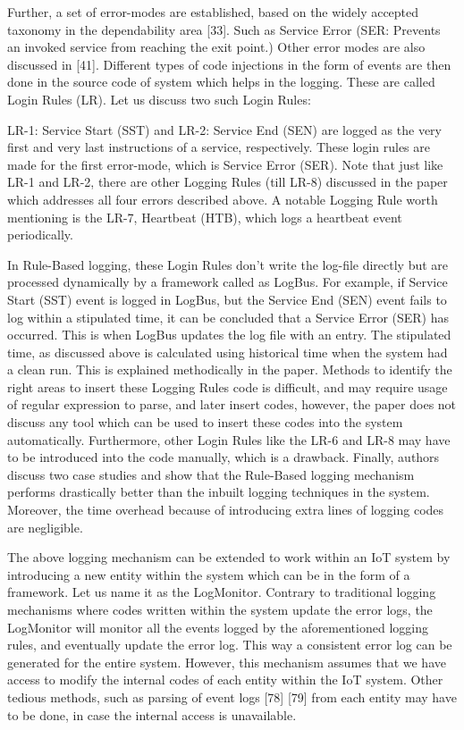 Further, a set of error-modes are established, based on the widely accepted taxonomy in the dependability area [33]. Such as Service Error (SER: Prevents an invoked service from reaching the exit point.) Other error modes are also discussed in [41]. Different types of code injections in the form of events are then done in the source code of system which helps in the logging. These are called Login Rules (LR). Let us discuss two such Login Rules:

LR-1: Service Start (SST) and LR-2: Service End (SEN) are logged as the very first and very last instructions of a service, respectively. These login rules are made for the first error-mode, which is Service Error (SER). Note that just like LR-1 and LR-2, there are other Logging Rules (till LR-8) discussed in the paper which addresses all four errors described above. A notable Logging Rule worth mentioning is the LR-7, Heartbeat (HTB), which logs a heartbeat event periodically. 

In Rule-Based logging, these Login Rules don’t write the log-file directly but are processed dynamically by a framework called as LogBus. For example, if Service Start (SST) event is logged in LogBus, but the Service End (SEN) event fails to log within a stipulated time, it can be concluded that a Service Error (SER) has occurred. This is when LogBus updates the log file with an entry. The stipulated time, as discussed above is calculated using historical time when the system had a clean run. This is explained methodically in the paper. Methods to identify the right areas to insert these Logging Rules code is difficult, and may require usage of regular expression to parse, and later insert codes, however, the paper does not discuss any tool which can be used to insert these codes into the system automatically. Furthermore, other Login Rules like the LR-6 and LR-8 may have to be introduced into the code manually, which is a drawback. Finally, authors discuss two case studies and show that the Rule-Based logging mechanism performs drastically better than the inbuilt logging techniques in the system. Moreover, the time overhead because of introducing extra lines of logging codes are negligible.

The above logging mechanism can be extended to work within an IoT system by introducing a new entity within the system which can be in the form of a framework. Let us name it as the LogMonitor. Contrary to traditional logging mechanisms where codes written within the system update the error logs, the LogMonitor will monitor all the events logged by the aforementioned logging rules, and eventually update the error log. This way a consistent error log can be generated for the entire system. However, this mechanism assumes that we have access to modify the internal codes of each entity within the IoT system. Other tedious methods, such as parsing of event logs [78] [79] from each entity may have to be done, in case the internal access is unavailable.

